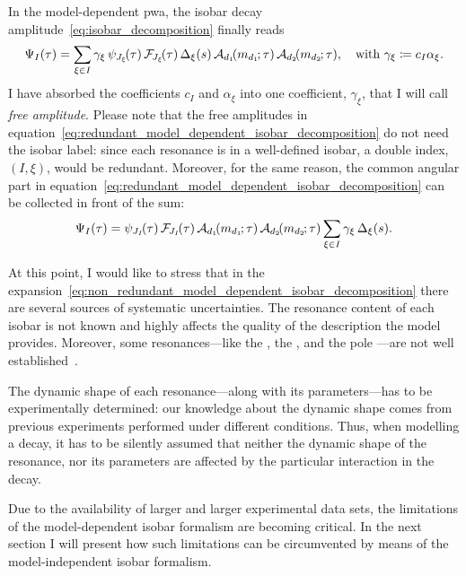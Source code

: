    In the model-dependent \ac{pwa}, the isobar decay amplitude~\eqref{eq:isobar_decomposition} finally reads
    \begin{equation}\label{eq:redundant_model_dependent_isobar_decomposition}
        \Psi_I(\tau) =  \sum_{\xi\in I} \gamma_\xi \,\psi_{J_\xi\!}(\tau)\,\mathcal{F\!}_{J_\xi\!}(\tau)\,\Delta_{\xi}(s)\,\mathcal{A}_{d_1}\!(m_{d_1\!}; \tau)\,\mathcal{A}_{d_2}\!(m_{d_2\!}; \tau),\quad
        \text{with }
        \gamma_\xi\coloneqq c_I \alpha_{\xi}.
    \end{equation}
    I have absorbed the coefficients $c_I$ and $\alpha_\xi$ into one coefficient, $\gamma_{\xi}$, that I will call \emph{free amplitude}.
    Please note that the free amplitudes in equation~\eqref{eq:redundant_model_dependent_isobar_decomposition} do not need the isobar label: since each resonance is in a well-defined isobar, a double index, $(I,\xi)$, would be redundant.
    Moreover, for the same reason, the common angular part in equation~\eqref{eq:redundant_model_dependent_isobar_decomposition} can be collected in front of the sum:
    \begin{equation}\label{eq:non_redundant_model_dependent_isobar_decomposition}
        \Psi_I(\tau) =  \psi_{J_I\!}(\tau)\,\mathcal{F\!}_{J_I\!}(\tau)\,\mathcal{A}_{d_1}\!(m_{d_1\!}; \tau)\,\mathcal{A}_{d_2}\!(m_{d_2\!}; \tau)\sum_{\xi\in I} \gamma_\xi \,\Delta_{\xi}(s).
    \end{equation}


    At this point, I would like to stress that in the expansion~\eqref{eq:non_redundant_model_dependent_isobar_decomposition} there are several sources of systematic uncertainties.
    The resonance content of each isobar is not known and highly affects the quality of the description the model provides.
    Moreover, some resonances---like the \Pfnez{}, the \Pfotsz, and the pole \Psigma{}---are not well established~\cite[\S~B]{PhysRevD.76.012001}.


    The dynamic shape of each resonance---along with its parameters---has to be experimentally determined: our knowledge about the dynamic shape comes from previous experiments performed under different conditions.
    Thus, when modelling a decay, it has to be silently assumed that neither the dynamic shape of the resonance, nor its parameters are affected by the particular interaction in the decay.


    Due to the availability of larger and larger experimental data sets, the limitations of the model-dependent isobar formalism are becoming critical.
    In the next section I will present how such limitations can be circumvented by means of the model-independent isobar formalism.


